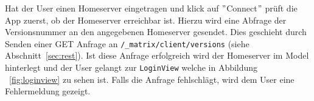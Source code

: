     Hat der User einen Homeserver eingetragen und klick auf \("\)Connect\("\) prüft die App zuerst, ob der Homeserver erreichbar ist.
    Hierzu wird eine Abfrage der Versionsnummer an den angegebenen Homeserver gesendet.
    Dies geschieht durch Senden einer GET Anfrage an \texttt{/\_matrix/client/versions} (siehe Abschnitt~\ref{sec:rest}).
    Ist diese Anfrage erfolgreich wird der Homeserver im Model hinterlegt und der User gelangt zur \texttt{LoginView} welche in Abbildung ~\ref{fig:loginview} zu sehen ist.
    Falls die Anfrage fehlschlägt, wird dem User eine Fehlermeldung gezeigt.
